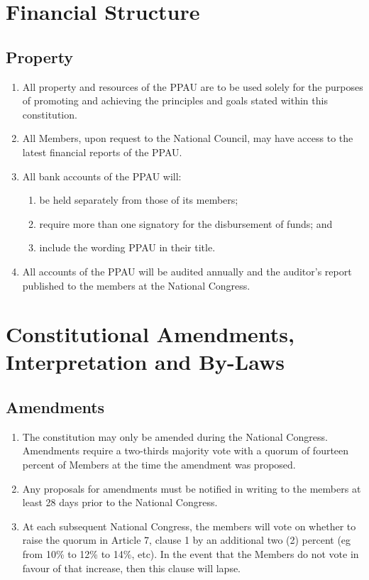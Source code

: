 \documentclass[a4paper,titlepage,8.5pt]{article}
\begin{document}
\section{Financial Structure}

\subsection{Property}

\begin{enumerate}
\item All property and resources of the PPAU are to be used solely for the purposes of promoting and achieving the principles and goals stated within this constitution.
\item All Members, upon request to the National Council, may have access to the latest financial reports of the PPAU.
\item All bank accounts of the PPAU will:
\begin{enumerate}
\item be held separately from those of its members;
\item require more than one signatory for the disbursement of funds; and 
\item include the wording PPAU in their title.
\end{enumerate}
\item All accounts of the PPAU will be audited annually and the auditor’s report published to the members at the National Congress.
\end{enumerate}

\section{Constitutional Amendments, Interpretation and By-Laws}

\subsection{Amendments}

\begin{enumerate}
\item The constitution may only be amended during the National Congress. Amendments require a two-thirds majority vote with a quorum of fourteen percent of Members at the time the amendment was proposed.
\item Any proposals for amendments must be notified in writing to the members at least 28 days prior to the National Congress.
\item At each subsequent National Congress, the members will vote on whether to raise the quorum in Article 7, clause 1 by an additional two (2) percent (eg from 10\% to 12\% to 14\%, etc). In the event that the Members do not vote in favour of that increase, then this clause will lapse.
\end{enumerate}
\end{document}
